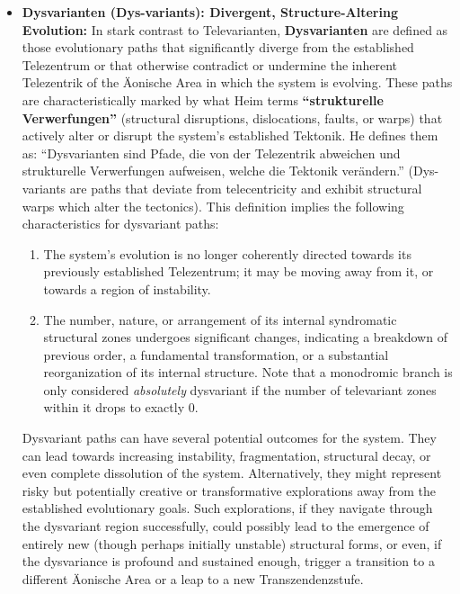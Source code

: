 \documentclass[12pt]{article}
\newcommand{\q}[1]{\enquote{#1}}
\begin{document}
\begin{itemize}
    \item \textbf{Dysvarianten (Dys-variants): Divergent, Structure-Altering Evolution:}
    In stark contrast to Televarianten, \textbf{Dysvarianten} are defined as those evolutionary paths that significantly diverge from the established Telezentrum or that otherwise contradict or undermine the inherent Telezentrik of the Äonische Area in which the system is evolving. These paths are characteristically marked by what Heim terms \textbf{\q{strukturelle Verwerfungen}} (structural disruptions, dislocations, faults, or warps) that actively alter or disrupt the system's established Tektonik. He defines them as: \q{Dysvarianten sind Pfade, die von der Telezentrik abweichen und strukturelle Verwerfungen aufweisen, welche die Tektonik verändern.} (Dys-variants are paths that deviate from telecentricity and exhibit structural warps which alter the tectonics).
    This definition implies the following characteristics for dysvariant paths:
    \begin{enumerate}
        \item The system's evolution is no longer coherently directed towards its previously established Telezentrum; it may be moving away from it, or towards a region of instability.
        \item The number, nature, or arrangement of its internal syndromatic structural zones undergoes significant changes, indicating a breakdown of previous order, a fundamental transformation, or a substantial reorganization of its internal structure. Note that a monodromic branch is only considered \textit{absolutely} dysvariant if the number of televariant zones within it drops to exactly 0.
    \end{enumerate}
    Dysvariant paths can have several potential outcomes for the system. They can lead towards increasing instability, fragmentation, structural decay, or even complete dissolution of the system. Alternatively, they might represent risky but potentially creative or transformative explorations away from the established evolutionary goals. Such explorations, if they navigate through the dysvariant region successfully, could possibly lead to the emergence of entirely new (though perhaps initially unstable) structural forms, or even, if the dysvariance is profound and sustained enough, trigger a transition to a different Äonische Area or a leap to a new Transzendenzstufe.


\end{itemize}
\end{document}
